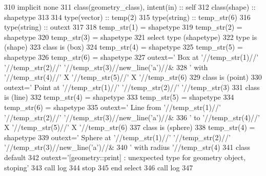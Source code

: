\begin{DoxyCode}
310     \textcolor{keywordtype}{implicit none}
311     \textcolor{keywordtype}{class}(geometry\_class), \textcolor{keywordtype}{intent(in)} :: self
312     \textcolor{keywordtype}{class}(shape) :: shapetype
313 
314     \textcolor{keywordtype}{type}(vector) :: temp(2)
315     \textcolor{keywordtype}{type}(string) :: temp\_str(6)
316     \textcolor{keywordtype}{type}(string) :: outext
317 
318     temp\_str(1) = shapetype%
319     temp\_str(2) = shapetype%
320     temp\_str(3) = shapetype%
321     \textcolor{keywordflow}{select type} (shapetype)
322 \textcolor{keywordflow}{    type is} (shape)
323 \textcolor{keywordflow}{    class is} (box)
324         temp\_str(4) = shapetype%
325         temp\_str(5) = shapetype%
326         temp\_str(6) = shapetype%
327         outext=\textcolor{stringliteral}{'      Box at '}//temp\_str(1)//\textcolor{stringliteral}{' '}//temp\_str(2)//\textcolor{stringliteral}{' '}//temp\_str(3)//new\_line(\textcolor{stringliteral}{'a'})//&
328             \textcolor{stringliteral}{'       with '}//temp\_str(4)//\textcolor{stringliteral}{' X '}//temp\_str(5)//\textcolor{stringliteral}{' X '}//temp\_str(6)
329 \textcolor{keywordflow}{    class is} (point)
330         outext=\textcolor{stringliteral}{'      Point at '}//temp\_str(1)//\textcolor{stringliteral}{' '}//temp\_str(2)//\textcolor{stringliteral}{' '}//temp\_str(3)
331 \textcolor{keywordflow}{    class is} (line)
332         temp\_str(4) = shapetype%
333         temp\_str(5) = shapetype%
334         temp\_str(6) = shapetype%
335         outext=\textcolor{stringliteral}{'      Line from '}//temp\_str(1)//\textcolor{stringliteral}{' '}//temp\_str(2)//\textcolor{stringliteral}{' '}//temp\_str(3)//new\_line(\textcolor{stringliteral}{'a'})//&
336             \textcolor{stringliteral}{'       to '}//temp\_str(4)//\textcolor{stringliteral}{' X '}//temp\_str(5)//\textcolor{stringliteral}{' X '}//temp\_str(6)
337 \textcolor{keywordflow}{    class is} (sphere)
338         temp\_str(4) = shapetype%
339         outext=\textcolor{stringliteral}{'      Sphere at '}//temp\_str(1)//\textcolor{stringliteral}{' '}//temp\_str(2)//\textcolor{stringliteral}{' '}//temp\_str(3)//new\_line(\textcolor{stringliteral}{'a'})//&
340             \textcolor{stringliteral}{'       with radius '}//temp\_str(4)
341 \textcolor{keywordflow}{        class default}
342         outext=\textcolor{stringliteral}{'[geometry::print] : unexpected type for geometry object, stoping'}
343         \textcolor{keyword}{call }log%
344         stop
345 \textcolor{keywordflow}{    end select}
346     \textcolor{keyword}{call }log%
347 
\end{DoxyCode}
\mbox{\label{namespacegeometry__mod_a6c03a4ea3de6763940396dbeb3908ebc}} 
